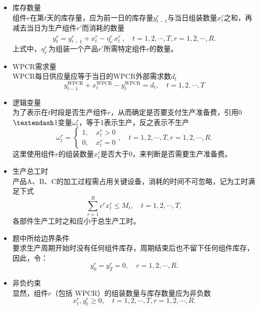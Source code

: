\begin{itemize}
	\item 库存数量\\
	组件$r$在第$t$天的库存量，应为前一日的库存量$y_{t-1}^{r}$与当日组装数量$x_{t}^{r}$之和，再减去当日为生产组件$r'$而消耗的数量
	\begin{equation}
		y_{t}^{r}=y_{t-1}^{r}+x_{t}^{r}-\eta_{r^{\prime}}^{r} x_{t}^{r^{\prime}},\quad t=1,2, \cdots, T, r=1,2, \cdots, R.
	\end{equation}
	上式中，$\eta_{r^{\prime}}^{r}$为组装一个产品$r'$所需特定组件$r$的数量。

	\item WPCR需求量\\
	WPCR每日供应量应等于当日的WPCR外部需求数$d_t$
	\begin{equation}
		y_{t-1}^{\mathrm{WPCR}}+x_{t}^{\mathrm{WPCR}}-y_{t}^{\mathrm{WPCR}}=d_{t}, \quad t=1,2, \cdots, T
	\end{equation}

	\item 逻辑变量\\
	为了表示在$t$时段是否生产组件$r$，从而确定是否要支付生产准备费，引用0$\textendash$1变量$\omega_{t}^{r}$，等于1表示生产，反之表示不生产
	\begin{equation}\label{key1}
		\omega_{t}^{r}=\left\{\begin{array}{l}
		1, \quad x_{t}^{r}>0 \\
		0, \quad x_{t}^{r}=0
		\end{array},\quad t=1,2, \cdots, T, r=1,2, \cdots, R.\right.
	\end{equation}
	这里使用组件$r$的组装数量$x_{t}^{r}$是否大于0，来判断是否需要生产准备费。

	\item 生产总工时\\
	产品A、B、C的加工过程需占用关键设备，消耗的时间不可忽略，记为工时满足下式
	\begin{equation}\label{key2}
		\sum_{r=1}^{R} c^{r} x_{t}^{r} \leqslant M_{t},\quad t=1,2, \cdots, T,
	\end{equation}
	各部件生产工时之和应小于总生产工时。

	\item 题中所给边界条件\\
	要求生产周期开始时没有任何组件库存，周期结束后也不留下任何组件库存，因此，令：
	\begin{equation}\label{边界条件}
		y_{0}^{r}=y_{T}^{r}=0,\quad  r=1,2, \cdots, R.
	\end{equation}

	\item 非负约束\\
	显然，组件$r$（包括 WPCR）的组装数量与库存数量应为非负数
	\begin{equation}
		x_{t}^{r},  y_{t}^{r} \geqslant 0, \quad t=1,2, \cdots, T, r=1,2, \cdots, R.
	\end{equation}
\end{itemize}


